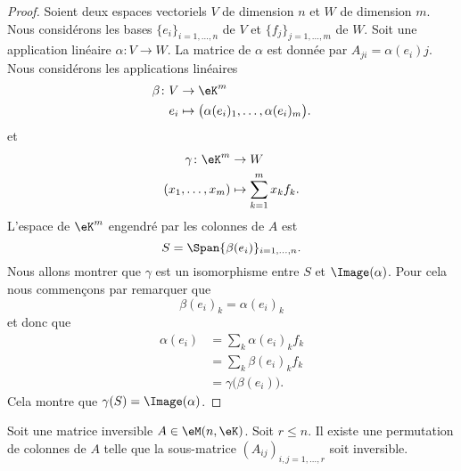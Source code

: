 \begin{proof}
	Soient deux espaces vectoriels \( V\) de dimension \( n\) et \( W\) de dimension \( m\). Nous considérons les bases \( \{ e_i \}_{i=1,\ldots,n}\) de \( V\) et \( \{ f_j \}_{j=1,\ldots,m}\) de \( W\). Soit une application linéaire \(\alpha \colon V\to W  \). La matrice de \( \alpha\) est donnée par \( A_{ji}=\alpha(e_i)j\). Nous considérons les applications linéaires
	\begin{equation}
		\begin{aligned}
			\beta\colon V & \to \eK^m                                               \\
			e_i           & \mapsto \big( \alpha(e_i)_1,\ldots,\alpha(e_i)_m \big).
		\end{aligned}
	\end{equation}
	et
	\begin{equation}
		\begin{aligned}
			\gamma\colon \eK^m & \to W                       \\
			(x_1,\ldots,x_m)   & \mapsto \sum_{k=1}^mx_kf_k.
		\end{aligned}
	\end{equation}
	L'espace de \( \eK^m\) engendré par les colonnes de \( A\) est
	\begin{equation}
		S=\Span\{ \beta(e_i) \}_{i=1,\ldots,n}.
	\end{equation}
	Nous allons montrer que \( \gamma\) est un isomorphisme entre \( S\) et \( \Image(\alpha)\). Pour cela nous commençons par remarquer que
	\begin{equation}
		\beta(e_i)_k=\alpha(e_i)_k
	\end{equation}
	et donc que
	\begin{subequations}
		\begin{align}
			\alpha(e_i) & =\sum_k\alpha(e_i)_kf_k        \\
			            & =\sum_k\beta(e_i)_kf_k         \\
			            & =\gamma\big( \beta(e_i) \big).
		\end{align}
	\end{subequations}
	Cela montre que \( \gamma(S)=\Image(\alpha)\).
\end{proof}

\begin{lemma}	\label{LEMooSWDMooRsLOyF}
	Soit une matrice inversible \( A\in \eM(n,\eK)\). Soit \( r\leq n\). Il existe une permutation de colonnes de \( A\) telle que la sous-matrice \( (A_{ij})_{i,j=1,\ldots,r}\) soit inversible.
\end{lemma}


